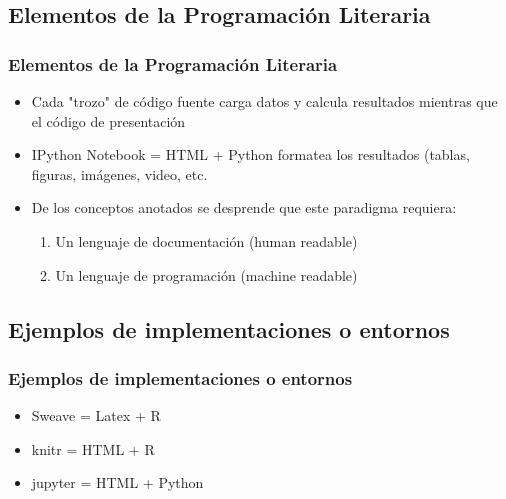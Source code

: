 \documentclass[sans serif,9pt,xcolor=dvipsnames]{beamer}%
\begin{document}
\subsection{Elementos de la Programación Literaria}
\begin{frame}
  \frametitle{Elementos de la Programación Literaria}
\begin{itemize}
\justifying
\item Cada "trozo" de código fuente carga datos y calcula resultados mientras que el código de presentación
\item IPython Notebook = HTML + Python formatea los resultados (tablas, figuras, imágenes, video, etc.\pause
\bigskip
 \item De los conceptos anotados se desprende que este paradigma requiera: \pause
\begin{enumerate}
\item Un lenguaje de documentación (human readable) \pause
\item Un lenguaje de programación (machine readable) \pause
\end{enumerate}
\end{itemize}
\end{frame}

\subsection{Ejemplos de implementaciones o entornos}
\begin{frame}
  \frametitle{Ejemplos de implementaciones o entornos}
\begin{itemize}
\justifying
\item Sweave = Latex + R
\bigskip
\item  knitr = HTML + R
\bigskip
\item  jupyter = HTML + Python
\bigskip
\end{itemize}
\end{frame}
\end{document}
